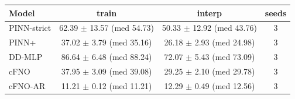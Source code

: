 \begin{tabular}{lccc}
\toprule
Model & train & interp & seeds \\
\midrule
PINN-strict & 62.39 $\pm$ 13.57 (med 54.73) & 50.33 $\pm$ 12.92 (med 43.76) & 3 \\
PINN+ & 37.02 $\pm$ 3.79 (med 35.16) & 26.18 $\pm$ 2.93 (med 24.98) & 3 \\
DD-MLP & 86.64 $\pm$ 6.48 (med 88.24) & 72.07 $\pm$ 5.43 (med 73.09) & 3 \\
cFNO & 37.95 $\pm$ 3.09 (med 39.08) & 29.25 $\pm$ 2.10 (med 29.78) & 3 \\
cFNO-AR & 11.21 $\pm$ 0.12 (med 11.21) & 12.29 $\pm$ 0.49 (med 12.56) & 3 \\
\bottomrule
\end{tabular}
